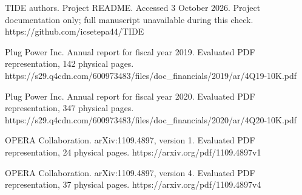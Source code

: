 \documentclass[11pt]{article}
\begin{document}
\begin{sloppypar}
\noindent TIDE authors. Project README. Accessed 3 October 2026. Project documentation only; full manuscript unavailable during this check. https://github.com/icsetepa44/TIDE\par\medskip
\noindent Plug Power Inc. Annual report for fiscal year 2019. Evaluated PDF representation, 142 physical pages. https://s29.q4cdn.com/600973483/files/doc\_financials/2019/ar/4Q19-10K.pdf\par\medskip
\noindent Plug Power Inc. Annual report for fiscal year 2020. Evaluated PDF representation, 347 physical pages. https://s29.q4cdn.com/600973483/files/doc\_financials/2020/ar/4Q20-10K.pdf\par\medskip
\noindent OPERA Collaboration. arXiv:1109.4897, version 1. Evaluated PDF representation, 24 physical pages. https://arxiv.org/pdf/1109.4897v1\par\medskip
\noindent OPERA Collaboration. arXiv:1109.4897, version 4. Evaluated PDF representation, 37 physical pages. https://arxiv.org/pdf/1109.4897v4\par\medskip
\end{sloppypar}
\end{document}
